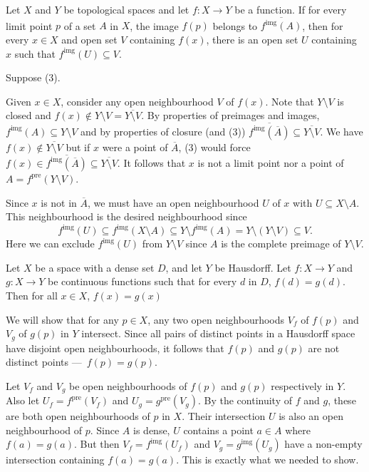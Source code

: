 \documentclass[12 pt, letterpaper]{hmcpset}
\begin{document}
\pagebreak

\begin{problem}[7.1, (3)  $\implies$ (4)]
	Let $X$ and $Y$ be topological spaces and let $f : X \to Y$ be a function. If for every limit point $p$ of a set $A$ in $X$, the image $f(p)$ belongs to $\overline{f^{\text{img}}(A)}$, then for every $x \in X$ and open set $V$ containing $f(x)$, there is an open set $U$ containing $x$ such that $f^{\text{img}}(U) \subseteq V$.
\end{problem}

\begin{solution}
	Suppose (3). 

	Given $x \in X$, consider any open neighbourhood $V$ of $f(x)$. Note that $Y \setminus V$ is closed and $f(x) \notin Y \setminus V = \overline{Y \setminus V}$. By properties of preimages and images, $f^{\text{img}}(A) \subseteq Y \setminus V$ and by properties of closure (and (3)) $\overline{f^{\text{img}}(\overline{A})} \subseteq \overline{Y \setminus V}$. We have $f(x) \notin \overline{Y \setminus V}$ but if $x$ were a point of $\overline{A}$, (3) would force $f(x) \in \overline{f^{\text{img}}(\overline{A})} \subseteq \overline{Y \setminus V}$. It follows that $x$ is not a limit point nor a point of $A = f^{\text{pre}}(Y \setminus V)$.

	Since $x$ is not in $\overline{A}$, we must have an open neighbourhood $U$ of $x$ with $U \subseteq X \setminus A$. This neighbourhood is the desired neighbourhood since 
	\[
		f^{\text{img}}(U) \subseteq f^{\text{img}}(X \setminus A) \subseteq Y \setminus f^{\text{img}}(A) = Y \setminus (Y \setminus V) \subseteq V.
	\]
	Here we can exclude $f^{\text{img}}(U)$ from $Y \setminus V$ since $A$ is the complete preimage of $Y \setminus V$.
\end{solution}

\pagebreak

\begin{problem}[7.7]
	Let $X$ be a space with a dense set $D$, and let $Y$ be Hausdorff. Let $f : X \to Y$ and $g : X \to Y$ be continuous functions such that for every $d$ in $D$, $f(d) = g(d)$. Then for all $x \in X$, $f(x) = g(x)$
\end{problem}

\begin{solution}
	We will show that for any $p \in X$, any two open neighbourhoods $V_{f}$ of $f(p)$ and $V_{g}$ of $g(p)$ in $Y$ intersect. Since all pairs of distinct points in a Hausdorff space have disjoint open neighbourhoods, it follows that $f(p)$ and $g(p)$ are not distinct points — $f(p) = g(p)$.

	Let $V_{f}$ and $V_{g}$ be open neighbourhoods of $f(p)$ and $g(p)$ respectively in $Y$. Also let $U_{f} = f^\text{pre}(V_{f})$ and $U_{g} = g^\text{pre}(V_{g})$. By the continuity of $f$ and $g$, these are both open neighbourhoods of $p$ in $X$. Their intersection $U$ is also an open neighbourhood of $p$. Since $A$ is dense, $U$ contains a point $a \in A$ where $f(a) = g(a)$. But then $V_{f} = f^\text{img}(U_{f})$ and $V_{g} = g^\text{img}(U_{g})$ have a non-empty intersection containing $f(a) = g(a)$. This is exactly what we needed to show.
\end{solution}
\end{document}
